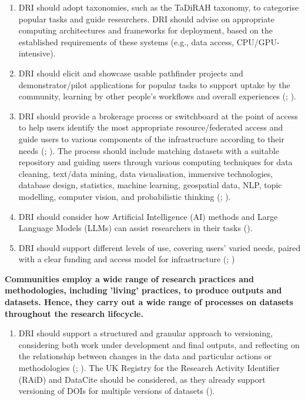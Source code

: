\documentclass[11pt]{scrartcl}
\begin{document}
\begin{enumerate}[resume]
\item DRI should adopt taxonomies, such as the TaDiRAH taxonomy, to categorise popular tasks and guide researchers. DRI should advise on appropriate computing architectures and frameworks for deployment, based on the established requirements of these systems (e.g., data access, CPU/GPU-intensive).   

\item DRI should elicit and showcase usable pathfinder projects and demonstrator/pilot applications for popular tasks to support uptake by the community, learning by other people's workflows and overall experiences (\cite[3,9]{bell_2025_17099176}; \cite[5]{evans23}).

\item DRI should provide a brokerage process or switchboard at the point of access to help users identify the most appropriate resource/federated access and guide users to various components of the infrastructure according to their needs 
(\cite[5]{bell_2025_17099176}; \cite{connected}).  
The process should include matching datasets with a suitable repository and guiding users through various computing techniques for data cleaning, text/data mining, data visualisation, immersive technologies, database design, statistics, machine learning, geospatial data, NLP, topic modelling, computer vision, and probabilistic thinking 
(\cite{connected}; \cite[38]{shoaib_sufi_2023_7686348}).   

\item DRI should consider how Artificial Intelligence (AI) methods and Large Language Models (LLMs) can assist researchers in their tasks 
(\cite[2]{bell_2025_17099176}).


\item DRI should support different levels of use, covering users' varied needs, paired with a clear funding and access model for infrastructure 
(\cite{Rodriguez22}; \cite[13]{Black19102024})
\end{enumerate}

\noindent\textbf{Communities employ a wide range of research practices and methodologies, including 'living' practices, to produce outputs and datasets. Hence, they carry out a wide range of processes on datasets throughout the research lifecycle. }

\begin{enumerate}[resume]
\item\label{itm:ver} DRI should support a structured and granular approach to versioning, considering both work under development and final outputs, and reflecting on the relationship between changes in the data and particular actions or methodologies 
(\cite[53]{de_roure_2022_4716148}; \cite[4]{wrro203045}). 
The UK Registry for the Research Activity Identifier (RAiD) and DataCite should be considered, as they already support versioning of DOIs for multiple versions of datasets (\cite[5]{evans23}).  
\end{enumerate}
\end{document}
